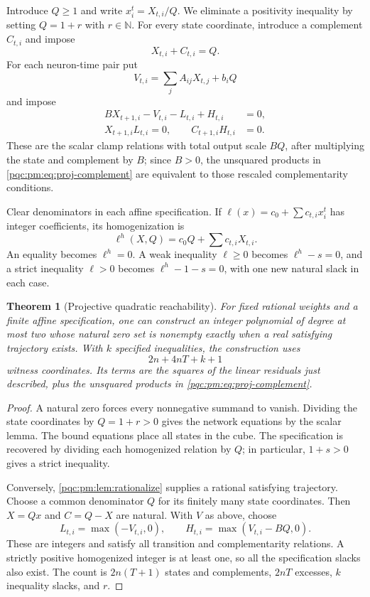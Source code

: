 \documentclass[11pt,letterpaper]{article}
\numberwithin{equation}{section}
\newtheorem{theorem}{Theorem}[section]
\theoremstyle{definition}
\theoremstyle{remark}
\newcommand{\N}{\mathbb N}
\begin{document}
Introduce $Q\geq1$ and write $x^t_i=X_{t,i}/Q$. We eliminate a positivity
inequality by setting $Q=1+r$ with $r\in\N$. For every state coordinate,
introduce a complement $C_{t,i}$ and impose
\begin{equation}\label{pqc:pm:eq:proj-bound}
 X_{t,i}+C_{t,i}=Q.
\end{equation}
For each neuron-time pair put
\[
 V_{t,i}=\sum_j A_{ij}X_{t,j}+b_iQ
\]
and impose
\begin{align}
 B X_{t+1,i}-V_{t,i}-L_{t,i}+H_{t,i}&=0,
 \label{pqc:pm:eq:proj-transition}\\
 X_{t+1,i}L_{t,i}=0,\qquad C_{t+1,i}H_{t,i}&=0.
 \label{pqc:pm:eq:proj-complement}
\end{align}
These are the scalar clamp relations with total output scale $BQ$, after
multiplying the state and complement by $B$; since $B>0$, the unsquared
products in \eqref{pqc:pm:eq:proj-complement} are equivalent to those rescaled
complementarity conditions.

Clear denominators in each affine specification. If
$\ell(x)=c_0+\sum c_{t,i}x^t_i$ has integer coefficients, its homogenization is
\[
 \ell^h(X,Q)=c_0Q+\sum c_{t,i}X_{t,i}.
\]
An equality becomes $\ell^h=0$. A weak inequality $\ell\geq0$ becomes
$\ell^h-s=0$, and a strict inequality $\ell>0$ becomes $\ell^h-1-s=0$, with
one new natural slack in each case.

\begin{theorem}[Projective quadratic reachability]\label{pqc:pm:thm:projective}
For fixed rational weights and a finite affine specification, one can
construct an integer polynomial of degree at most two whose natural zero set
is nonempty exactly when a real satisfying trajectory exists. With $k$
specified inequalities, the construction uses
\begin{equation}\label{pqc:pm:eq:proj-count}
 2n+4nT+k+1
\end{equation}
witness coordinates. Its terms are the squares of the linear residuals just
described, plus the unsquared products in \eqref{pqc:pm:eq:proj-complement}.
\end{theorem}

\begin{proof}
A natural zero forces every nonnegative summand to vanish. Dividing the state
coordinates by $Q=1+r>0$ gives the network equations by the scalar lemma.
The bound equations place all states in the cube. The specification is
recovered by dividing each homogenized relation by $Q$; in particular,
$1+s>0$ gives a strict inequality.

Conversely, \cref{pqc:pm:lem:rationalize} supplies a rational satisfying trajectory.
Choose a common denominator $Q$ for its finitely many state coordinates. Then
$X=Qx$ and $C=Q-X$ are natural. With $V$ as above, choose
\[
 L_{t,i}=\max(-V_{t,i},0),\qquad
 H_{t,i}=\max(V_{t,i}-BQ,0).
\]
These are integers and satisfy all transition and complementarity relations.
A strictly positive homogenized integer is at least one, so all the
specification slacks also exist. The count is $2n(T+1)$ states and
complements, $2nT$ excesses, $k$ inequality slacks, and $r$.
\end{proof}
\end{document}
